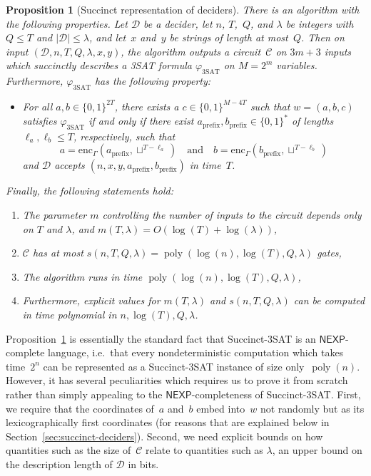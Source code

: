 \documentclass[11pt]{article}
\newtheorem{proposition}[theorem]{Proposition}
\theoremstyle{definition}
\DeclareMathOperator{\poly}{poly}
\newcommand{\decider}{\mathcal{D}}
\newcommand{\circuit}{\mathcal{C}}
\newcommand{\qlen}{Q}
\begin{document}
\begin{proposition}[Succinct representation of deciders]
  \label{prop:standard-succinct-sat}
  There is an algorithm with the following properties.
  Let $\decider$ be a decider, let $n$, $T$,~$\qlen$, and $\lambda$ be integers
  with $\qlen \leq T$ and $|\decider| \leq \lambda$, and let~$x$ and~$y$ be
  strings of length at most~$\qlen$.
  Then on input $(\decider, n, T, \qlen, \lambda, x, y)$, the algorithm outputs
  a circuit~$\circuit$ on $3m + 3$ inputs which succinctly describes a 3SAT
  formula $\varphi_{\mathrm{3SAT}}$ on $M = 2^m$ variables.
  Furthermore, $\varphi_{\mathrm{3SAT}}$ has the following property:
  \begin{itemize}
  \item For all $a, b \in \{0, 1\}^{2T}$, there exists a $c \in \{0, 1\}^{M-4T}$
    such that $w = (a, b, c)$ satisfies $\varphi_{\mathrm{3SAT}}$ if and only if
    there exist $a_{\mathrm{prefix}}, b_{\mathrm{prefix}} \in \{0, 1\}^*$ of
    lengths~$\ell_a, \ell_b \leq T$, respectively, such that
    \begin{equation*}
      a = \mathrm{enc}_\Gamma(a_{\mathrm{prefix}}, \sqcup^{T - \ell_a})
      \quad
      \text{and}
      \quad
      b = \mathrm{enc}_\Gamma(b_{\mathrm{prefix}}, \sqcup^{T - \ell_b})
    \end{equation*}
    and $\decider$ accepts $(n, x, y, a_{\mathrm{prefix}}, b_{\mathrm{prefix}})$
    in time~$T$.
  \end{itemize}
  Finally, the following statements hold:
  \begin{enumerate}
  \item The parameter $m$ controlling the number of inputs to the circuit
    depends only on $T$ and $\lambda$, and $m(T,\lambda) = O(\log(T) +
    \log(\lambda))$,
  \item $\circuit$ has at most $s(n,T,\qlen,\lambda)=\poly(\log(n), \log(T),
    \qlen, \lambda)$ gates,
  \item The algorithm runs in time $\poly(\log(n), \log(T), \qlen,\lambda)$,
  \item Furthermore, explicit values for $m(T, \lambda)$ and
    $s(n, T, \qlen, \lambda)$ can be computed in time polynomial in
    $n,\log(T),\qlen,\lambda$.
  \end{enumerate}
\end{proposition}

Proposition~\ref{prop:standard-succinct-sat} is essentially the standard fact
that Succinct-3SAT is an $\mathsf{NEXP}$-complete language, i.e.\ that every
nondeterministic computation which takes time~$2^n$ can be represented as a
Succinct-3SAT instance of size only~$\poly(n)$.
However, it has several peculiarities which requires us to prove it from scratch
rather than simply appealing to the $\mathsf{NEXP}$-completeness of
Succinct-3SAT.
First, we require that the coordinates of~$a$ and~$b$ embed into~$w$ not
randomly but as its lexicographically first coordinates (for reasons that are
explained below in Section~\ref{sec:succinct-deciders}).
Second, we need explicit bounds on how quantities such as the size of~$\circuit$
relate to quantities such as $\lambda$, an upper bound on the description length
of $\decider$ in bits.
\end{document}
